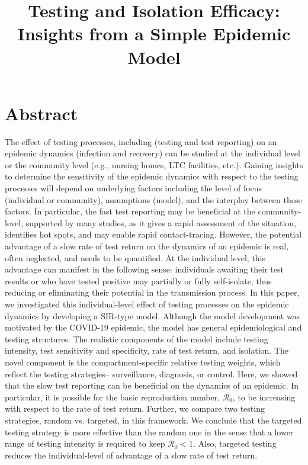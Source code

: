 \documentclass[12pt]{article}
\title{Testing and Isolation Efficacy: Insights from a Simple Epidemic Model}
\newcommand{\Rnum}{\ensuremath{\mathcal{R}_0}}
\newcommand{\covid}{COVID-19\xspace}
\DeclareRobustCommand\_{\ifmmode\expandafter\subtxt\else\textunderscore\fi}
\theoremstyle{definition} %
\begin{document}
\maketitle

\linenumbers

\section{Abstract}

The effect of testing processes, including (testing and test reporting) on an epidemic dynamics (infection and recovery) can be studied at the individual level or the community level (e.g., nursing homes, LTC facilities, etc.). 
Gaining insights to determine the sensitivity of the epidemic dynamics with respect to the testing processes will depend on underlying factors including the level of focus (individual or community), assumptions (model), and the interplay between these factors. 
In particular, the fast test reporting may be beneficial at the community-level, supported by many studies, as it gives a rapid assessment of the situation, identifies hot spots, and may enable rapid contact-tracing. However, the potential advantage of a slow rate of test return on the dynamics of an epidemic is real, often neglected, and needs to be quantified. At the individual level, this advantage can manifest in the following sense: individuals awaiting their test results or who have tested positive may partially or fully self-isolate, thus reducing or eliminating their potential in the transmission process.
In this paper, we investigated this individual-level effect of testing processes on the epidemic dynamics by developing a SIR-type model.
Although the model development was motivated by the \covid epidemic, the model has general epidemiological and testing structures. The realistic components of the model include testing intensity, test sensitivity and specificity, rate of test return, and isolation. The novel component is the compartment-specific relative testing weights, which reflect the testing strategies-- surveillance, diagnosis, or control.
Here, we showed that the slow test reporting can be beneficial on the dynamics of an epidemic. In particular, it is possible for the basic reproduction number, $\Rnum$, to be increasing with respect to the rate of test return.  
Further, we compare two testing strategies, random vs. targeted, in this framework. We conclude that the targeted testing strategy is more effective than the random one in the sense that a lower range of testing intensity is required to keep $\Rnum <1$. Also, targeted testing reduces the individual-level of advantage of a slow rate of test return.   
\end{document}
